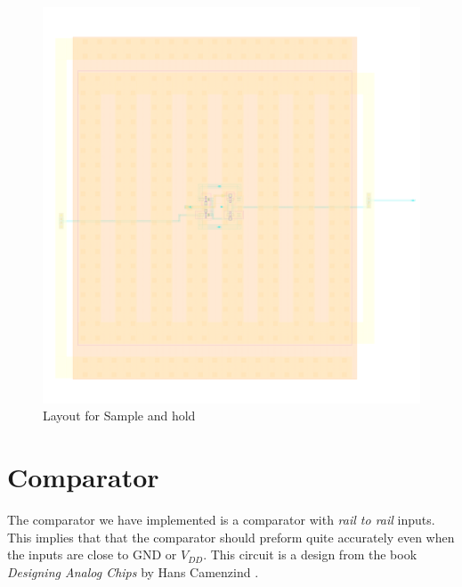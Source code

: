 \documentclass[english, 12pt, a4paper]{ifimaster}
\begin{document}
\begin{figure}[!ht]
 \centering
 \includegraphics[width=\textwidth]{img/layout/sample_hold}
 \caption{Layout for Sample and hold}
 \label{fig:layout:sh}
\end{figure}




\section{Comparator}
The comparator we have implemented is a comparator with \textit{rail to rail} inputs. This implies that that the comparator should preform quite accurately even when the inputs are close to 
GND or \(V_{DD}\). This circuit is a design from the book \textit{Designing Analog Chips} by Hans Camenzind \cite{hansc}.
\end{document}

